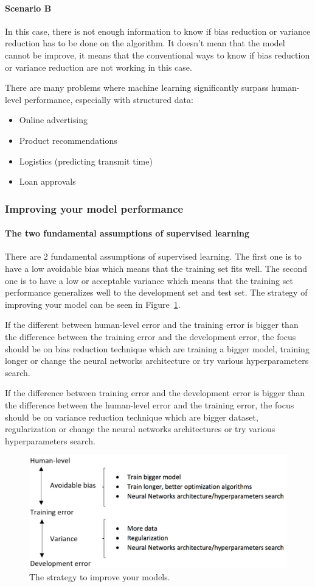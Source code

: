 \documentclass[UTF8]{article}
\begin{document}
\paragraph{Scenario B}
In this case, there is not enough information to know if bias reduction or variance reduction has
to be done on the algorithm. It doesn't mean that the model cannot be improve, it means that the
conventional ways to know if bias reduction or variance reduction are not working in this case.

There are many problems where machine learning significantly surpass human-level performance,
especially with structured data:
\begin{itemize}
    \item Online advertising
    \item Product recommendations
    \item Logistics (predicting transmit time)
    \item Loan approvals
\end{itemize}

\subsubsection{Improving your model performance}
\paragraph{The two fundamental assumptions of supervised learning}
There are 2 fundamental assumptions of supervised learning. The first one is to have a low
avoidable bias which means that the training set fits well. The second one is to have a low or
acceptable variance which means that the training set performance generalizes well to the
development set and test set. The strategy of improving your model can be seen in
Figure~\ref{figures/improve-model}.

If the different between human-level error and the training error is bigger than the difference
between the training error and the development error, the focus should be on bias reduction
technique which are training a bigger model, training longer or change the neural networks
architecture or try various hyperparameters search.

If the difference between training error and the development error is bigger than the difference
between the human-level error and the training error, the focus should be on variance reduction
technique which are bigger dataset, regularization or change the neural networks architectures or
try various hyperparameters search.

\begin{figure}[htb]
    \centering
    \includegraphics[width=40em]{figures/improve-model}
    \caption{The strategy to improve your models.}
    \label{figures/improve-model}
\end{figure}
\end{document}
